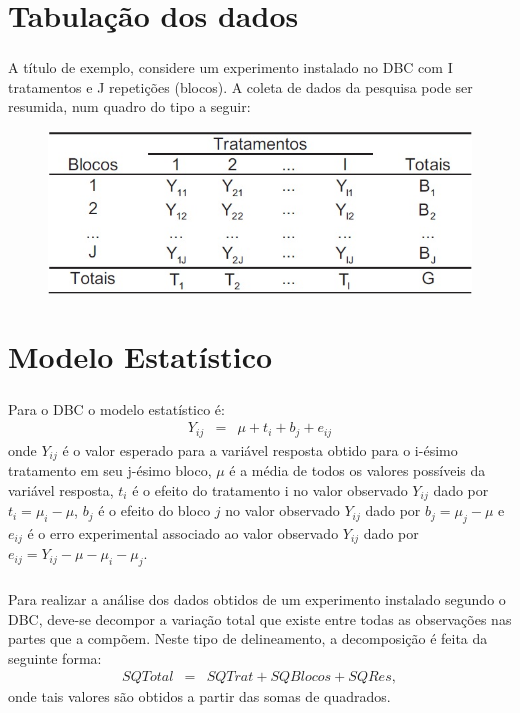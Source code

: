 \documentclass[14pt,aspectratio=1610]{beamer}
\begin{document}
\section{Tabulação dos dados}
\begin{frame}{}
\frametitle{}
\begin{block}{}
\justifying
A título de exemplo, considere um experimento instalado no DBC com I tratamentos
e J repetições (blocos). A coleta de dados da pesquisa pode ser resumida, num quadro do tipo a seguir:
\begin{figure}[H]
    \centering
    \includegraphics[scale=0.5]{Figuras/Tabulacao}
  \end{figure}
\end{block}
\end{frame}

\section{Modelo Estatístico}
\begin{frame}{}
\frametitle{}
\begin{block}{}
\justifying
Para o DBC o modelo estatístico é:
\begin{eqnarray*}
Y_{ij} &=& \mu + t_i + b_j + e_{ij}
\end{eqnarray*}
onde $Y_{ij}$ é o valor esperado para a variável resposta obtido para o i-ésimo tratamento em seu j-ésimo bloco, $\mu$ é a média de todos os valores possíveis da variável resposta, $t_i$ é o efeito do tratamento i no valor observado $Y_{ij}$ dado por $t_i = \mu_i - \mu$, $b_j$ é o efeito do bloco $j$ no valor observado $Y_{ij}$ dado por $b_j = \mu_j - \mu$ e $e_{ij}$ é o erro experimental associado ao valor observado $Y_{ij}$ dado por $e_{ij} = Y_{ij} - \mu - \mu_i - \mu_j$.
\end{block}
\end{frame}

\begin{frame}{}
\frametitle{}
\begin{block}{}
\justifying
Para realizar a análise dos dados obtidos de um experimento instalado segundo o DBC, deve-se decompor a variação total que existe entre todas as observações nas partes que a compõem. Neste tipo de delineamento, a decomposição é feita da seguinte forma:
\begin{eqnarray*}
SQTotal &=& SQTrat + SQBlocos + SQRes,
\end{eqnarray*}
onde tais valores são obtidos a partir das somas de quadrados.
\end{block}
\end{frame}
\end{document}
